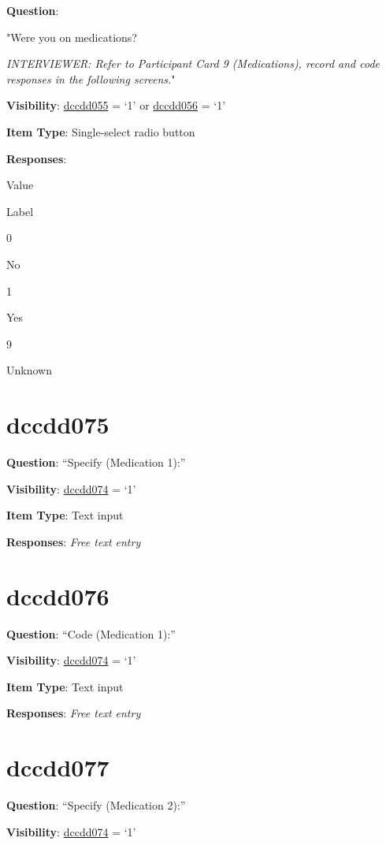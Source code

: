 \documentclass[]{book}
\begin{document}
\textbf{Question}:

"Were you on medications?

\emph{INTERVIEWER: Refer to Participant Card 9 (Medications), record and code responses in the following screens.}"

\textbf{Visibility}: \protect\hyperlink{dccdd055}{dccdd055} = `1' or \protect\hyperlink{dccdd056}{dccdd056} = `1'

\textbf{Item Type}: Single-select radio button

\textbf{Responses}:

Value

Label

0

No

1

Yes

9

Unknown

\hypertarget{dccdd075}{%
\section{dccdd075}\label{dccdd075}}

\textbf{Question}: ``Specify (Medication 1):''

\textbf{Visibility}: \protect\hyperlink{dccdd074}{dccdd074} = `1'

\textbf{Item Type}: Text input

\textbf{Responses}: \emph{Free text entry}

\hypertarget{dccdd076}{%
\section{dccdd076}\label{dccdd076}}

\textbf{Question}: ``Code (Medication 1):''

\textbf{Visibility}: \protect\hyperlink{dccdd074}{dccdd074} = `1'

\textbf{Item Type}: Text input

\textbf{Responses}: \emph{Free text entry}

\hypertarget{dccdd077}{%
\section{dccdd077}\label{dccdd077}}

\textbf{Question}: ``Specify (Medication 2):''

\textbf{Visibility}: \protect\hyperlink{dccdd074}{dccdd074} = `1'
\end{document}
